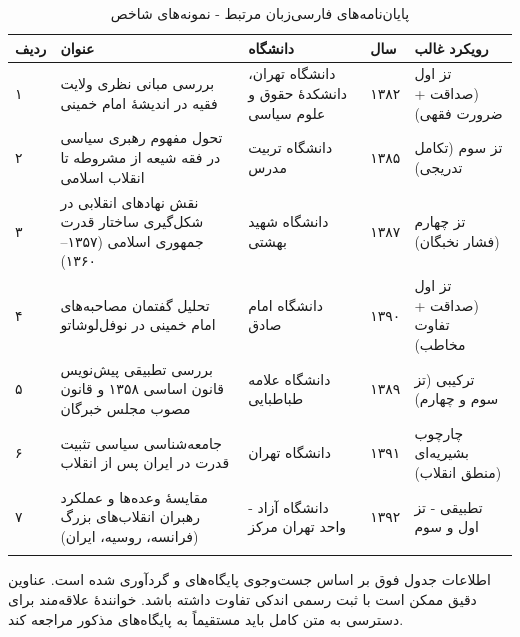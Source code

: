 \documentclass[12pt,a4paper]{book}
\newcommand{\en}[1]{\lr{\textit{#1}}}
\begin{document}
\begin{longtable}{%
    >{\raggedleft\arraybackslash}p{}
    >{\raggedleft\arraybackslash}p{}
    >{\raggedleft\arraybackslash}p{}
    >{\raggedleft\arraybackslash}p{}
    >{\raggedleft\arraybackslash}p{}}
\toprule
\rowcolor{cPrimary!10}
\textbf{ردیف} & \textbf{عنوان} & \textbf{دانشگاه} & \textbf{سال} & \textbf{رویکرد غالب} \\
\midrule
\endhead

۱ &
بررسی مبانی نظری ولایت فقیه در اندیشهٔ امام خمینی &
دانشگاه تهران، دانشکدهٔ حقوق و علوم سیاسی &
۱۳۸۲ &
تز اول (صداقت + ضرورت فقهی) \\
\midrule

۲ &
تحول مفهوم رهبری سیاسی در فقه شیعه از مشروطه تا انقلاب اسلامی &
دانشگاه تربیت مدرس &
۱۳۸۵ &
تز سوم (تکامل تدریجی) \\
\midrule

۳ &
نقش نهادهای انقلابی در شکل‌گیری ساختار قدرت جمهوری اسلامی (۱۳۵۷–۱۳۶۰) &
دانشگاه شهید بهشتی &
۱۳۸۷ &
تز چهارم (فشار نخبگان) \\
\midrule

۴ &
تحلیل گفتمان مصاحبه‌های امام خمینی در نوفل‌لوشاتو &
دانشگاه امام صادق &
۱۳۹۰ &
تز اول (صداقت + تفاوت مخاطب) \\
\midrule

۵ &
بررسی تطبیقی پیش‌نویس قانون اساسی ۱۳۵۸ و قانون مصوب مجلس خبرگان &
دانشگاه علامه طباطبایی &
۱۳۸۹ &
ترکیبی (تز سوم و چهارم) \\
\midrule

۶ &
جامعه‌شناسی سیاسی تثبیت قدرت در ایران پس از انقلاب &
دانشگاه تهران &
۱۳۹۱ &
چارچوب بشیریه‌ای (منطق انقلاب) \\
\midrule

۷ &
مقایسهٔ وعده‌ها و عملکرد رهبران انقلاب‌های بزرگ (فرانسه، روسیه، ایران) &
دانشگاه آزاد - واحد تهران مرکز &
۱۳۹۲ &
تطبیقی - تز اول و سوم \\

\bottomrule
\caption{پایان‌نامه‌های فارسی‌زبان مرتبط - نمونه‌های شاخص}
\label{tab:theses-persian}
\end{longtable}

\begin{warningBox}[تذکر]
اطلاعات جدول فوق بر اساس جست‌وجوی پایگاه‌های \en{IRANDOC} و \en{SID.ir} گردآوری شده است. عناوین دقیق ممکن است با ثبت رسمی اندکی تفاوت داشته باشد. خوانندهٔ علاقه‌مند برای دسترسی به متن کامل باید مستقیماً به پایگاه‌های مذکور مراجعه کند.
\end{warningBox}
\end{document}
